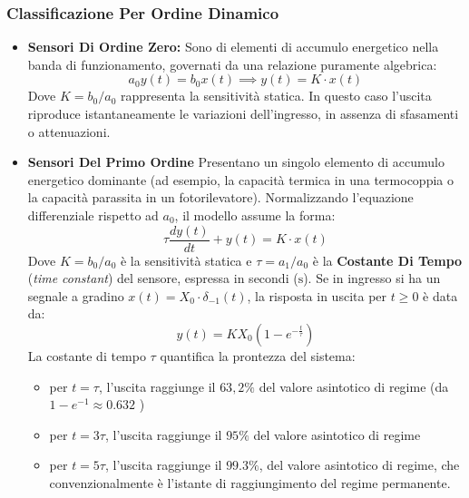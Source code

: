 ﻿\documentclass[11pt, a4paper]{article}
\begin{document}
\subsubsection{Classificazione Per Ordine Dinamico}
\begin{itemize}
\item \textbf{Sensori Di Ordine Zero:} Sono di elementi di accumulo energetico nella banda di funzionamento, governati da una relazione puramente algebrica:
\[
    a_0 y(t) = b_0 x(t) \implies y(t) = K \cdot x(t)
\]
Dove $K = b_0 / a_0$ rappresenta la sensitività statica. In questo caso l'uscita riproduce istantaneamente le variazioni dell'ingresso, in assenza di sfasamenti o attenuazioni.

\item \textbf{Sensori Del Primo Ordine}
Presentano un singolo elemento di accumulo energetico dominante (ad esempio, la capacità termica in una termocoppia o la capacità parassita in un fotorilevatore). Normalizzando l'equazione differenziale rispetto ad $a_0$, il modello assume la forma:
\[
    \tau \frac{dy(t)}{dt} + y(t) = K \cdot x(t)
\]
Dove $K = b_0 / a_0$ è la sensitività statica e $\tau = a_1 / a_0$ è la \textbf{Costante Di Tempo} (\textit{time constant}) del sensore, espressa in secondi ($\si{\second}$). Se in ingresso si ha un segnale a gradino $x(t) = X_0 \cdot \delta_{-1}(t)$, la risposta in uscita per $t \ge 0$ è data da:
\[
    y(t) = K X_0 \left( 1 - e^{-\frac{t}{\tau}} \right)
\]
La costante di tempo $\tau$ quantifica la prontezza del sistema:
\begin{itemize}
    \item per $t = \tau$, l'uscita raggiunge il $63,2\%$ del valore asintotico di regime (da $1 - e^{-1} \approx 0.632$ )
    \item per $t = 3\tau$, l'uscita raggiunge il $95\%$ del valore asintotico di regime
    \item per $t = 5\tau$, l'uscita raggiunge il $99.3\%$, del valore asintotico di regime, che convenzionalmente è l'istante di raggiungimento del regime permanente.
\end{itemize}

\begin{figure}[H]
    \centering
\end{figure}
\end{itemize}
\end{document}
